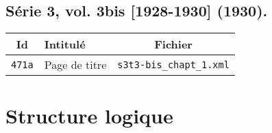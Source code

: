 \subsection{Série 3, vol. 3bis [1928-1930] (1930).}
\label{mappings3t3bis}

\begin{center}
\begin{longtable}{ | c | p{9.5cm} | c | }
\hline
Id & Intitulé & Fichier \\ \hline
\texttt{471a} & Page de titre & \texttt{s3t3-bis\_chapt\_1.xml} \\ \hline
\end{longtable}
\end{center}

\clearpage

\section{Structure logique}
\label{structure}

